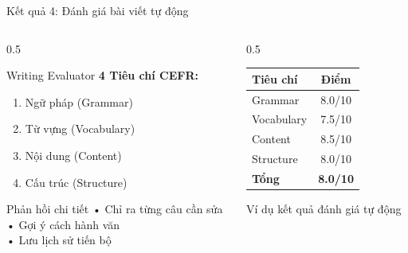 \documentclass[notheorems,hyperref={bookmarks=true}]{beamer}
\begin{document}
\begin{frame}{Kết quả 4: Đánh giá bài viết tự động}
\begin{columns}[c]
    \begin{column}{0.5\textwidth}
        \begin{exampleblock}{Writing Evaluator}
            \textbf{4 Tiêu chí CEFR:}
            \begin{enumerate}
                \item Ngữ pháp (Grammar)
                \item Từ vựng (Vocabulary)
                \item Nội dung (Content)
                \item Cấu trúc (Structure)
            \end{enumerate}
        \end{exampleblock}
        
        \vspace{0.5cm}
        
        \begin{block}{Phản hồi chi tiết}
            • Chỉ ra từng câu cần sửa\\
            • Gợi ý cách hành văn\\
            • Lưu lịch sử tiến bộ
        \end{block}
    \end{column}
    \begin{column}{0.5\textwidth}
        \centering
        \begin{table}
            \tiny
            \begin{tabular}{|l|c|}
                \hline
                \rowcolor{purple!20} \textbf{Tiêu chí} & \textbf{Điểm} \\
                \hline
                Grammar & 8.0/10 \\
                \hline
                Vocabulary & 7.5/10 \\
                \hline
                Content & 8.5/10 \\
                \hline
                Structure & 8.0/10 \\
                \hline
                \rowcolor{green!20} \textbf{Tổng} & \textbf{8.0/10} \\
                \hline
            \end{tabular}
        \end{table}
        
        \vspace{0.5cm}
        
        {\scriptsize Ví dụ kết quả đánh giá tự động}
    \end{column}
\end{columns}
\end{frame}
\end{document}
